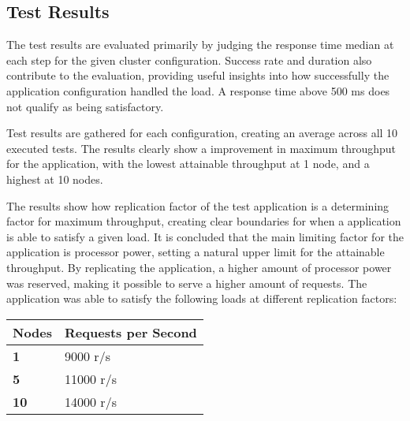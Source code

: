 \subsection{Test Results}
The test results are evaluated primarily by judging the response time median at each step for the given cluster configuration. Success rate and duration also contribute to the evaluation, providing useful insights into how successfully the application configuration handled the load. A response time above 500 ms does not qualify as being satisfactory.


Test results are gathered for each configuration, creating an average across all 10 executed tests. The results clearly show a improvement in maximum throughput for the application, with the lowest attainable throughput at 1 node, and a highest at 10 nodes.

The results show how replication factor of the test application is a determining factor for maximum throughput, creating clear boundaries for when a application is able to satisfy a given load. It is concluded that the main limiting factor for the application is processor power, setting a natural upper limit for the attainable throughput. By replicating the application, a higher amount of processor power was reserved, making it possible to serve a higher amount of requests. The application was able to satisfy the following loads at different replication factors:

\begin{center}
\begin{tabular}{ |p{2cm}|p{5cm}|  }
 \hline
{\textbf{Nodes}} & {\textbf{Requests per Second}}\\
 \hline
 \textbf{1} & 9000 r/s\\
 \hline
 \textbf{5} & 11000 r/s\\ 
 \hline
 \textbf{10} & 14000 r/s\\ 
 \hline
\end{tabular}
\end{center}

